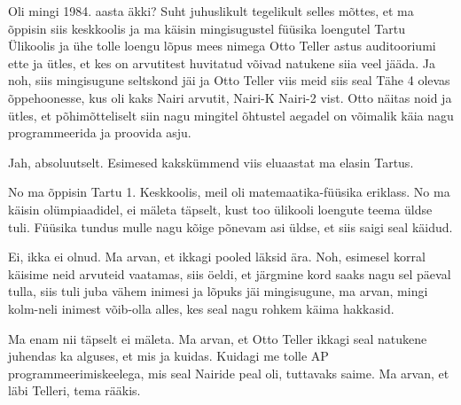 

Oli mingi 1984. aasta äkki? Suht juhuslikult tegelikult selles mõttes, et ma õppisin siis keskkoolis ja ma käisin mingisugustel füüsika loengutel Tartu Ülikoolis ja ühe tolle loengu lõpus mees nimega Otto Teller astus auditooriumi ette ja ütles, et kes on arvutitest huvitatud võivad natukene siia veel jääda. Ja noh, siis mingisugune seltskond jäi ja Otto Teller viis meid siis seal Tähe 4 olevas õppehoonesse, kus oli kaks Nairi arvutit, Nairi-K Nairi-2 vist. Otto näitas noid ja ütles, et põhimõtteliselt siin nagu mingitel õhtustel aegadel on võimalik käia nagu programmeerida ja proovida asju.


Jah, absoluutselt. Esimesed kakskümmend viis eluaastat ma elasin Tartus. 


No ma õppisin Tartu 1. Keskkoolis, meil oli matemaatika-füüsika eriklass. No ma käisin olümpiaadidel, ei mäleta täpselt, kust too ülikooli loengute teema üldse tuli. Füüsika tundus mulle nagu kõige põnevam asi üldse, et siis  saigi seal käidud.


Ei, ikka ei olnud. Ma arvan, et ikkagi pooled läksid ära. Noh, esimesel korral käisime neid arvuteid vaatamas, siis öeldi, et järgmine kord saaks nagu sel päeval tulla, siis tuli juba vähem inimesi ja lõpuks jäi mingisugune, ma arvan, mingi kolm-neli inimest võib-olla alles, kes seal nagu rohkem käima hakkasid.


Ma enam nii täpselt ei mäleta. Ma arvan, et Otto Teller ikkagi seal natukene juhendas ka alguses, et mis ja kuidas. Kuidagi me tolle AP programmeerimiskeelega, mis seal Nairide  peal oli, tuttavaks saime. Ma arvan, et läbi Telleri, tema rääkis.

